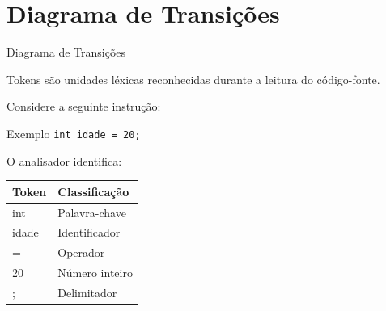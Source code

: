 \documentclass[aspectratio=169, 11pt]{beamer}
\begin{document}
\section{Diagrama de Transições}

\begin{frame}{Diagrama de Transições}

    Tokens são unidades léxicas reconhecidas durante
    a leitura do código-fonte.

    \vspace{0.3cm}

    Considere a seguinte instrução:

    \begin{block}{Exemplo}
        \texttt{int idade = 20;}
    \end{block}

    O analisador identifica:

    \begin{center}
    \begin{tabular}{ll}
        \toprule
        \textbf{Token} & \textbf{Classificação} \\
        \midrule
        int & Palavra-chave \\
        idade & Identificador \\
        = & Operador \\
        20 & Número inteiro \\
        ; & Delimitador \\
        \bottomrule
    \end{tabular}
    \end{center}

\end{frame}
\end{document}
